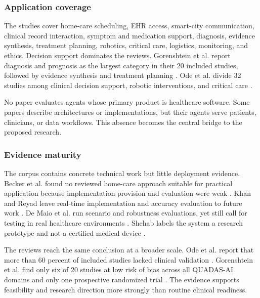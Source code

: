 \documentclass[11pt,a4paper]{article}
\begin{document}
\subsubsection{Application coverage}

The studies cover home-care scheduling, EHR access, smart-city communication, clinical record interaction, symptom and medication support, diagnosis, evidence synthesis, treatment planning, robotics, critical care, logistics, monitoring, and ethics. Decision support dominates the reviews. Gorenshtein et al. report diagnosis and prognosis as the largest category in their 20 included studies, followed by evidence synthesis and treatment planning \cite[pp.~10--12]{gorenshtein2025clinical}. Ode et al. divide 32 studies among clinical decision support, robotic interventions, and critical care \cite[pp.~1--4]{ode2025evidence}.

No paper evaluates agents whose primary product is healthcare software. Some papers describe architectures or implementations, but their agents serve patients, clinicians, or data workflows. This absence becomes the central bridge to the proposed research.

\subsubsection{Evidence maturity}

The corpus contains concrete technical work but little deployment evidence. Becker et al. found no reviewed home-care approach suitable for practical application because implementation provision and evaluation were weak \cite[pp.~11--12]{becker2018survey}. Khan and Reyad leave real-time implementation and accuracy evaluation to future work \cite[p.~5]{khan2019ibac}. De Maio et al. run scenario and robustness evaluations, yet still call for testing in real healthcare environments \cite[pp.~6--9]{demaio2025privacy}. Shehab labels the system a research prototype and not a certified medical device \cite[p.~1]{shehab2025agentic}.

The reviews reach the same conclusion at a broader scale. Ode et al. report that more than 60 percent of included studies lacked clinical validation \cite[p.~1]{ode2025evidence}. Gorenshtein et al. find only six of 20 studies at low risk of bias across all QUADAS-AI domains and only one prospective randomized trial \cite[pp.~10--13]{gorenshtein2025clinical}. The evidence supports feasibility and research direction more strongly than routine clinical readiness.
\end{document}
